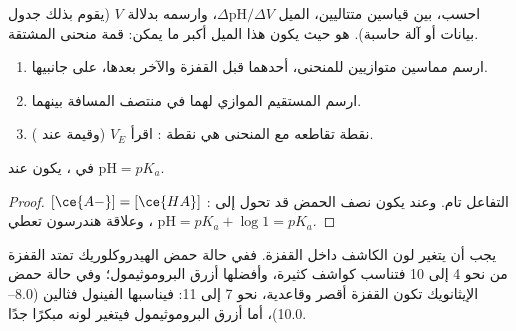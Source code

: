 \begin{method}\label{met:g12:ph-conductivity-titrations:derivative}
احسب، بين قياسين متتاليين، الميل
$\Delta\mathrm{pH}/\Delta V$، وارسمه بدلالة $V$ (يقوم بذلك جدول بيانات أو
آلة حاسبة).  هو حيث يكون هذا الميل
أكبر ما يمكن: قمة منحنى المشتقة.
\end{method}

\begin{method}\label{met:g12:ph-conductivity-titrations:tangent}
\begin{enumerate}
  \item ارسم مماسين متوازيين للمنحنى، أحدهما قبل القفزة والآخر بعدها،
        على جانبيها.
  \item ارسم المستقيم الموازي لهما في منتصف المسافة بينهما.
  \item نقطة تقاطعه مع المنحنى هي نقطة : اقرأ $V_E$ (وقيمة
         عند ).
\end{enumerate}
\end{method}

\begin{proposition}[عند نصف التكافؤ، $\mathrm{pH} = pK_a$]\label{prop:g12:ph-conductivity-titrations:half}
في    ، يكون عند
 $\mathrm{pH} = pK_a$.
\end{proposition}

\begin{proof}
التفاعل  تام. وعند  يكون نصف
الحمض قد تحول إلى : $[\ce{A-}] = [\ce{HA}]$،
وعلاقة هندرسون تعطي $\mathrm{pH} = pK_a + \log 1 = pK_a$.
\end{proof}

\begin{remark}\label{rem:g12:ph-conductivity-titrations:indicator}
يجب أن يتغير لون الكاشف داخل القفزة. ففي حالة حمض الهيدروكلوريك
تمتد القفزة من نحو  4 إلى 10 فتناسب كواشف كثيرة، وأفضلها أزرق البروموثيمول؛
وفي حالة حمض الإيثانويك تكون القفزة أقصر وقاعدية، نحو 7 إلى 11:
فيناسبها الفينول فثالين (8.0--10.0)، أما أزرق البروموثيمول فيتغير لونه
مبكرًا جدًا.
\end{remark}

